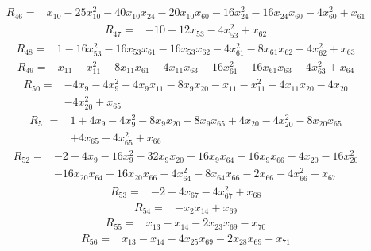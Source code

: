 \[
\begin{aligned}
R_{46}={}&x_{10}-25x_{10}^{2}-40x_{10}x_{24}-20x_{10}x_{60}-16x_{24}^{2}-16x_{24}x_{60}-4x_{60}^{2}+x_{61}
\end{aligned}
\]
\[
\begin{aligned}
R_{47}={}&-10-12x_{53}-4x_{53}^{2}+x_{62}
\end{aligned}
\]
\[
\begin{aligned}
R_{48}={}&1-16x_{53}^{2}-16x_{53}x_{61}-16x_{53}x_{62}-4x_{61}^{2}-8x_{61}x_{62}-4x_{62}^{2}+x_{63}
\end{aligned}
\]
\[
\begin{aligned}
R_{49}={}&x_{11}-x_{11}^{2}-8x_{11}x_{61}-4x_{11}x_{63}-16x_{61}^{2}-16x_{61}x_{63}-4x_{63}^{2}+x_{64}
\end{aligned}
\]
\[
\begin{aligned}
R_{50}={}&-4x_{9}-4x_{9}^{2}-4x_{9}x_{11}-8x_{9}x_{20}-x_{11}-x_{11}^{2}-4x_{11}x_{20}-4x_{20}\\
&-4x_{20}^{2}+x_{65}
\end{aligned}
\]
\[
\begin{aligned}
R_{51}={}&1+4x_{9}-4x_{9}^{2}-8x_{9}x_{20}-8x_{9}x_{65}+4x_{20}-4x_{20}^{2}-8x_{20}x_{65}\\
&+4x_{65}-4x_{65}^{2}+x_{66}
\end{aligned}
\]
\[
\begin{aligned}
R_{52}={}&-2-4x_{9}-16x_{9}^{2}-32x_{9}x_{20}-16x_{9}x_{64}-16x_{9}x_{66}-4x_{20}-16x_{20}^{2}\\
&-16x_{20}x_{64}-16x_{20}x_{66}-4x_{64}^{2}-8x_{64}x_{66}-2x_{66}-4x_{66}^{2}+x_{67}
\end{aligned}
\]
\[
\begin{aligned}
R_{53}={}&-2-4x_{67}-4x_{67}^{2}+x_{68}
\end{aligned}
\]
\[
\begin{aligned}
R_{54}={}&-x_{2}x_{14}+x_{69}
\end{aligned}
\]
\[
\begin{aligned}
R_{55}={}&x_{13}-x_{14}-2x_{23}x_{69}-x_{70}
\end{aligned}
\]
\[
\begin{aligned}
R_{56}={}&x_{13}-x_{14}-4x_{25}x_{69}-2x_{28}x_{69}-x_{71}
\end{aligned}
\]

